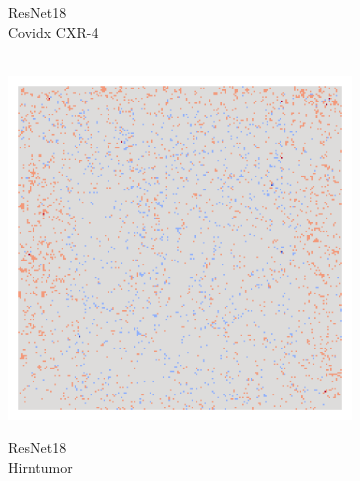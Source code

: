 \begin{figure}[H]
\begin{subfigure}{0.19\linewidth}
        \caption{ResNet18 \\Covidx CXR-4}
    \end{subfigure}
    \hfill%
    \begin{subfigure}{0.19\linewidth}
        \centering
         \\
        \includegraphics[width=\linewidth]{01-images/05-resultate/uap_resnet18/uap0-resnet18-mri_data-n200-robustificationslevel0.png}
        \caption{ResNet18 \\ Hirntumor}
    \end{subfigure}
    \hfill%
    \begin{subfigure}{0.19\linewidth}
        \centering
        \\

\end{subfigure}
\end{figure}
